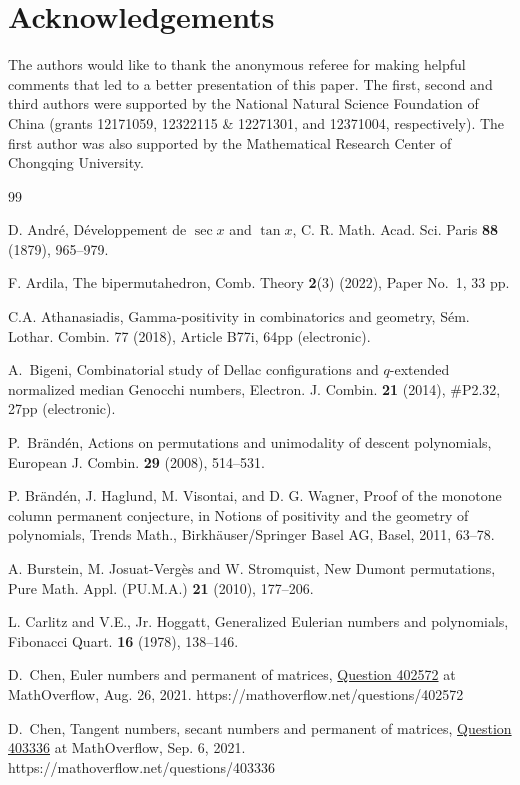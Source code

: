 \documentclass[11pt,reqno]{amsart}
\numberwithin{equation}{section}
\theoremstyle{plain}
\theoremstyle{definition}
\begin{document}
\section*{Acknowledgements}
The authors would like to thank the anonymous referee for making helpful comments that led to a better presentation of this paper. The first, second and third authors were supported by the National Natural Science Foundation of China
(grants 12171059, 12322115 \& 12271301, and 12371004, respectively). The first author was also supported by the Mathematical Research Center of Chongqing University.

\begin{thebibliography}{99}



 D. Andr\'e, D\'eveloppement de $\sec x$ and $\tan x$, C. R. Math. Acad. Sci. Paris {\bf 88} (1879), 965--979.

 F. Ardila, The bipermutahedron, Comb. Theory {\bf 2}(3) (2022), Paper No.~1, 33 pp.

 C.A. Athanasiadis, Gamma-positivity in combinatorics and geometry, S\'em. Lothar. Combin. 77 (2018), Article B77i, 64pp (electronic).


 A.~Bigeni, Combinatorial study of Dellac configurations and $q$-extended normalized median Genocchi numbers, Electron. J. Combin. {\bf 21} (2014), \#P2.32, 27pp (electronic).

 P.~Br\"and\'en, Actions on permutations and unimodality of descent polynomials, European J. Combin. {\bf29} (2008), 514--531.

P. Br{\"a}nd{\'e}n, J. Haglund, M. Visontai, and D. G. Wagner, Proof of the
monotone column permanent conjecture, in Notions of positivity and the
geometry of polynomials, Trends Math., Birkh\"auser/Springer Basel AG, Basel,
2011, 63--78.

 A. Burstein, M. Josuat-Verg\`es and W. Stromquist,
New Dumont permutations, Pure Math. Appl. (PU.M.A.)  {\bf 21} (2010),  177--206.

 L. Carlitz and V.E., Jr. Hoggatt, Generalized Eulerian numbers and polynomials, Fibonacci Quart. \textbf{16} (1978), 138--146.

 D.~Chen, Euler numbers and permanent of matrices,
\href{https://mathoverflow.net/questions/402572}{Question 402572} at MathOverflow, Aug. 26, 2021.
https://mathoverflow.net/questions/402572

 D.~Chen, Tangent numbers, secant numbers and permanent of matrices,
\href{https://mathoverflow.net/questions/403336}{Question 403336} at MathOverflow, Sep. 6, 2021.
https://mathoverflow.net/questions/403336


\end{thebibliography}
\end{document}
